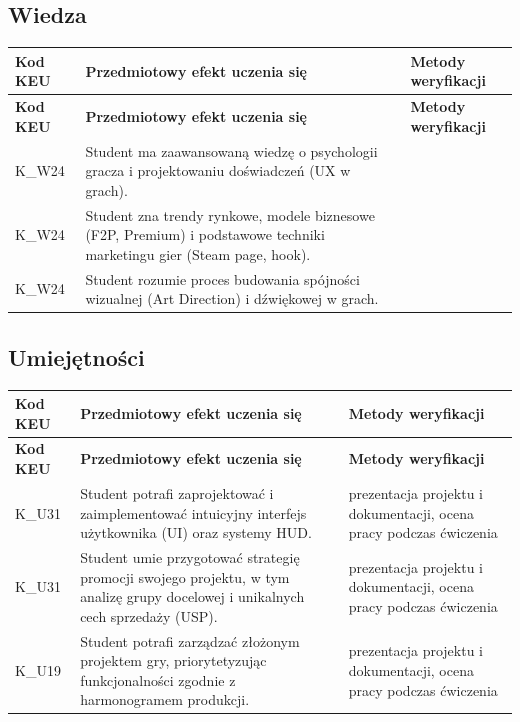 \documentclass[12pt, a4paper]{article}
\newcommand{\thdrule}{\noalign{\global\setlength{\extrarowheight}{0pt}}}
\newcommand{\thdend}{\noalign{\global\setlength{\extrarowheight}{3pt}}}
\begin{document}
\subsection*{Wiedza}
{\scriptsize
\begin{longtable}{m{1.6cm}m{9.0cm}m{4.2cm}}
\thdrule\toprule
\rowcolor{pjatkRed} {\color{white}\footnotesize\textbf{\vphantom{Ag}Kod KEU}} & {\color{white}\footnotesize\textbf{\vphantom{Ag}Przedmiotowy efekt uczenia się}} & {\color{white}\footnotesize\textbf{\vphantom{Ag}Metody weryfikacji}} \\
\midrule\thdend
\endfirsthead
\thdrule\toprule
\rowcolor{pjatkRed} {\color{white}\footnotesize\textbf{\vphantom{Ag}Kod KEU}} & {\color{white}\footnotesize\textbf{\vphantom{Ag}Przedmiotowy efekt uczenia się}} & {\color{white}\footnotesize\textbf{\vphantom{Ag}Metody weryfikacji}} \\
\midrule\thdend
\endhead
  \rowcolor{tableRowLight} K\_W24 & Student ma zaawansowaną wiedzę o psychologii gracza i projektowaniu doświadczeń (UX w grach). &  \\
  \rowcolor{tableRowAlt} K\_W24 & Student zna trendy rynkowe, modele biznesowe (F2P, Premium) i podstawowe techniki marketingu gier (Steam page, hook). &  \\
  \rowcolor{tableRowLight} K\_W24 & Student rozumie proces budowania spójności wizualnej (Art Direction) i dźwiękowej w grach. &  \\
\bottomrule
\end{longtable}}

\subsection*{Umiejętności}
{\scriptsize
\begin{longtable}{m{1.6cm}m{9.0cm}m{4.2cm}}
\thdrule\toprule
\rowcolor{pjatkRed} {\color{white}\footnotesize\textbf{\vphantom{Ag}Kod KEU}} & {\color{white}\footnotesize\textbf{\vphantom{Ag}Przedmiotowy efekt uczenia się}} & {\color{white}\footnotesize\textbf{\vphantom{Ag}Metody weryfikacji}} \\
\midrule\thdend
\endfirsthead
\thdrule\toprule
\rowcolor{pjatkRed} {\color{white}\footnotesize\textbf{\vphantom{Ag}Kod KEU}} & {\color{white}\footnotesize\textbf{\vphantom{Ag}Przedmiotowy efekt uczenia się}} & {\color{white}\footnotesize\textbf{\vphantom{Ag}Metody weryfikacji}} \\
\midrule\thdend
\endhead
  \rowcolor{tableRowLight} K\_U31 & Student potrafi zaprojektować i zaimplementować intuicyjny interfejs użytkownika (UI) oraz systemy HUD. & prezentacja projektu i dokumentacji, ocena pracy podczas ćwiczenia \\
  \rowcolor{tableRowAlt} K\_U31 & Student umie przygotować strategię promocji swojego projektu, w tym analizę grupy docelowej i unikalnych cech sprzedaży (USP). & prezentacja projektu i dokumentacji, ocena pracy podczas ćwiczenia \\
  \rowcolor{tableRowLight} K\_U19 & Student potrafi zarządzać złożonym projektem gry, priorytetyzując funkcjonalności zgodnie z harmonogramem produkcji. & prezentacja projektu i dokumentacji, ocena pracy podczas ćwiczenia \\
\bottomrule
\end{longtable}}
\end{document}

